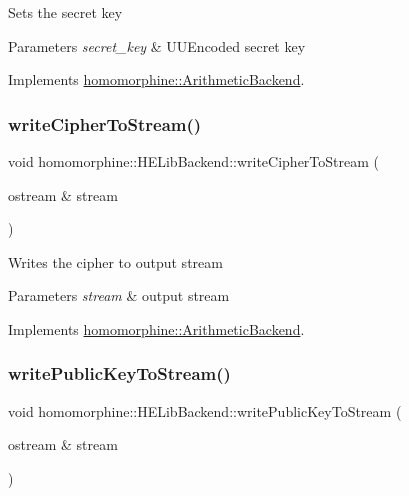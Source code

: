Sets the secret key


\begin{DoxyParams}{Parameters}
{\em secret\+\_\+key} & U\+U\+Encoded secret key \\
\hline
\end{DoxyParams}


Implements \hyperlink{classhomomorphine_1_1_arithmetic_backend_a0bb3c2728df4662c6472d4d43215410f}{homomorphine\+::\+Arithmetic\+Backend}.

\mbox{\label{classhomomorphine_1_1_h_e_lib_backend_a3ec7bec3476ac21921f518ba7a3ff6b2}} 
\subsubsection{\texorpdfstring{write\+Cipher\+To\+Stream()}{writeCipherToStream()}}
{\footnotesize\ttfamily void homomorphine\+::\+H\+E\+Lib\+Backend\+::write\+Cipher\+To\+Stream (\begin{DoxyParamCaption}\item[{ostream \&}]{stream }\end{DoxyParamCaption})\hspace{0.3cm}{\ttfamily [virtual]}}

Writes the cipher to output stream


\begin{DoxyParams}{Parameters}
{\em stream} & output stream \\
\hline
\end{DoxyParams}


Implements \hyperlink{classhomomorphine_1_1_arithmetic_backend_a659d4f63a1020d942d561b7fa5e9eddf}{homomorphine\+::\+Arithmetic\+Backend}.

\mbox{\label{classhomomorphine_1_1_h_e_lib_backend_acd7a366e43b8408d370424f136fc9f21}} 
\subsubsection{\texorpdfstring{write\+Public\+Key\+To\+Stream()}{writePublicKeyToStream()}}
{\footnotesize\ttfamily void homomorphine\+::\+H\+E\+Lib\+Backend\+::write\+Public\+Key\+To\+Stream (\begin{DoxyParamCaption}\item[{ostream \&}]{stream }\end{DoxyParamCaption})\hspace{0.3cm}{\ttfamily [virtual]}}


